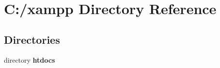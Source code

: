 \section{C\+:/xampp Directory Reference}
\label{dir_516e7709f2195dc55b84d083c8c936b3}
\subsection*{Directories}
\begin{DoxyCompactItemize}
\item 
directory {\bf htdocs}
\end{DoxyCompactItemize}
